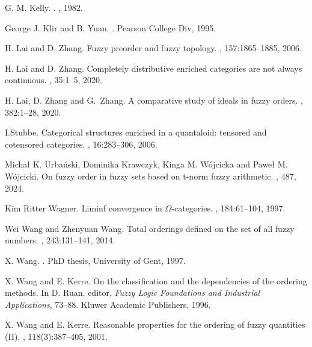 \documentclass[preprint,3p,times]{elsarticle}
\theoremstyle{plain}
\theoremstyle{definition}
\numberwithin{equation}{section}
\begin{document}
\begin{thebibliography}{}
G. M. Kelly.
.
, 1982.

George J. Klir and B. Yuan.
.
\newblock Pearson  College Div, 1995.

H. Lai and D. Zhang.
\newblock Fuzzy preorder and fuzzy topology.
, 157:1865--1885, 2006.

H. Lai and D. Zhang.
\newblock Completely distributive enriched categories are not always continuous.
, 35:1--5, 2020.

H. Lai, D. Zhang and G.~Zhang.
\newblock A comparative study of ideals in fuzzy orders.
, 382:1--28, 2020.

I.Stubbe.
\newblock Categorical structures enriched in a quantaloid: tensored and cotensored categories.
, 16:283--306, 2006.

Michał K. Urbański, Dominika Krawczyk, Kinga M. Wójcicka and Paweł M. Wójcicki.
\newblock On fuzzy order in fuzzy sets based on t-norm fuzzy arithmetic.
, 487, 2024.


Kim Ritter Wagner.
\newblock Liminf convergence in \(\Omega\)-categories.
, 184:61--104, 1997.

Wei Wang and Zhenyuan Wang.
\newblock Total orderings defined on the set of all fuzzy numbers.
, 243:131--141, 2014.

X. Wang.
.
\newblock PhD thesis, University of Gent, 1997.

X. Wang and E. Kerre.
\newblock On the classification and the dependencies of the ordering methods.
\newblock  In D. Ruan, editor, { \em Fuzzy Logic Foundations and Industrial Applications}, 73--88. Kluwer Academic Publishers, 1996.

X. Wang and E. Kerre.
\newblock Reasonable properties for the ordering of fuzzy quantities (II).
, 118(3):387--405, 2001.


\end{thebibliography}
\end{document}
